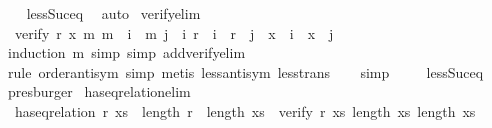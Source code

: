\begin{isabellebody}
\ \ \isamarkupfalse%
\ less{\isacharunderscore}{\kern0pt}Suc{\isacharunderscore}{\kern0pt}eq\ \isamarkupfalse%
\ auto%
\endisatagproof
{\isafoldproof}%
%
\isadelimproof
\isanewline
%
\endisadelimproof
\isanewline
{}\isamarkupfalse%
\ verify{\isacharunderscore}{\kern0pt}elim{\isacharcolon}{\kern0pt}\isanewline
\ \ {\isachardoublequoteopen}verify\ r\ x\ m\ m\ {\isacharequal}{\kern0pt}\ {\isacharparenleft}{\kern0pt}{\isasymforall}i\ {\isacharless}{\kern0pt}\ m{\isachardot}{\kern0pt}\ {\isasymforall}j\ {\isacharless}{\kern0pt}\ i{\isachardot}{\kern0pt}\ {\isacharparenleft}{\kern0pt}r\ {\isacharbang}{\kern0pt}\ i\ {\isacharequal}{\kern0pt}\ r\ {\isacharbang}{\kern0pt}\ j{\isacharparenright}{\kern0pt}\ {\isacharequal}{\kern0pt}\ {\isacharparenleft}{\kern0pt}x\ {\isacharbang}{\kern0pt}\ i\ {\isacharequal}{\kern0pt}\ x\ {\isacharbang}{\kern0pt}\ j{\isacharparenright}{\kern0pt}{\isacharparenright}{\kern0pt}{\isachardoublequoteclose}\isanewline
%
\isadelimproof
\ \ %
\endisadelimproof
%
\isatagproof
{}\isamarkupfalse%
\ {\isacharparenleft}{\kern0pt}induction\ m{\isacharcomma}{\kern0pt}\ simp{\isacharcomma}{\kern0pt}\ simp\ add{\isacharcolon}{\kern0pt}verify{\isacharunderscore}{\kern0pt}elim{\isacharunderscore}{\kern0pt}{}{\isacharparenright}{\kern0pt}\isanewline
\ \ \isamarkupfalse%
\ {\isacharparenleft}{\kern0pt}rule\ order{\isacharunderscore}{\kern0pt}antisym{\isacharcomma}{\kern0pt}\ simp{\isacharcomma}{\kern0pt}\ metis\ less{\isacharunderscore}{\kern0pt}antisym\ less{\isacharunderscore}{\kern0pt}trans{\isacharparenright}{\kern0pt}\isanewline
\ \ \isamarkupfalse%
\ {\isacharparenleft}{\kern0pt}simp{\isacharparenright}{\kern0pt}\ \isanewline
\ \ \isamarkupfalse%
\ less{\isacharunderscore}{\kern0pt}Suc{\isacharunderscore}{\kern0pt}eq\ \isamarkupfalse%
\ presburger%
\endisatagproof
{\isafoldproof}%
%
\isadelimproof
\isanewline
%
\endisadelimproof
\isanewline
{}\isamarkupfalse%
\ has{\isacharunderscore}{\kern0pt}eq{\isacharunderscore}{\kern0pt}relation{\isacharunderscore}{\kern0pt}elim{\isacharcolon}{\kern0pt}\isanewline
\ \ {\isachardoublequoteopen}has{\isacharunderscore}{\kern0pt}eq{\isacharunderscore}{\kern0pt}relation\ r\ xs\ {\isacharequal}{\kern0pt}\ {\isacharparenleft}{\kern0pt}length\ r\ {\isacharequal}{\kern0pt}\ length\ xs\ {\isasymand}\ verify\ r\ xs\ {\isacharparenleft}{\kern0pt}length\ xs{\isacharparenright}{\kern0pt}\ {\isacharparenleft}{\kern0pt}length\ xs{\isacharparenright}{\kern0pt}{\isacharparenright}{\kern0pt}{\isachardoublequoteclose}\isanewline

\end{isabellebody}
